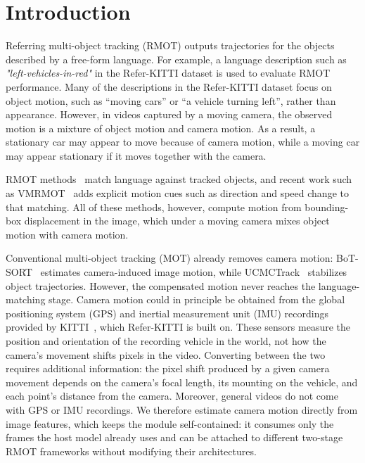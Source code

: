 \documentclass[sigconf,anonymous,nonacm]{acmart}
\begin{document}

\maketitle
\thispagestyle{empty}
\pagestyle{empty}

\section{Introduction}
\label{sec:intro}

Referring multi-object tracking (RMOT) outputs trajectories for the objects described by a free-form language. For example, a language description such as \emph{"left-vehicles-in-red"} in the Refer-KITTI dataset is used to evaluate RMOT performance. Many of the descriptions in the Refer-KITTI dataset focus on object motion, such as ``moving cars'' or ``a vehicle turning left'', rather than appearance. However, in videos captured by a moving camera, the observed motion is a mixture of object motion and camera motion. As a result, a stationary car may appear to move because of camera motion, while a moving car may appear stationary if it moves together with the camera.

RMOT methods~\cite{transrmot,ikun,flexhook} match language against tracked objects, and recent work such as VMRMOT~\cite{vmrmot} adds explicit motion cues such as direction and speed change to that matching. All of these methods, however, compute motion from bounding-box displacement in the image, which under a moving camera mixes object motion with camera motion.

Conventional multi-object tracking (MOT) already removes camera motion: BoT-SORT~\cite{botsort} estimates camera-induced image motion, while UCMCTrack~\cite{ucmctrack} stabilizes object trajectories. However, the compensated motion never reaches the language-matching stage. Camera motion could in principle be obtained from the global positioning system (GPS) and inertial measurement unit (IMU) recordings provided by KITTI~\cite{kitti}, which Refer-KITTI is built on. These sensors measure the position and orientation of the recording vehicle in the world, not how the camera's movement shifts pixels in the video. Converting between the two requires additional information: the pixel shift produced by a given camera movement depends on the camera's focal length, its mounting on the vehicle, and each point's distance from the camera. Moreover, general videos do not come with GPS or IMU recordings. We therefore estimate camera motion directly from image features, which keeps the module self-contained: it consumes only the frames the host model already uses and can be attached to different two-stage RMOT frameworks without modifying their architectures.
\end{document}
